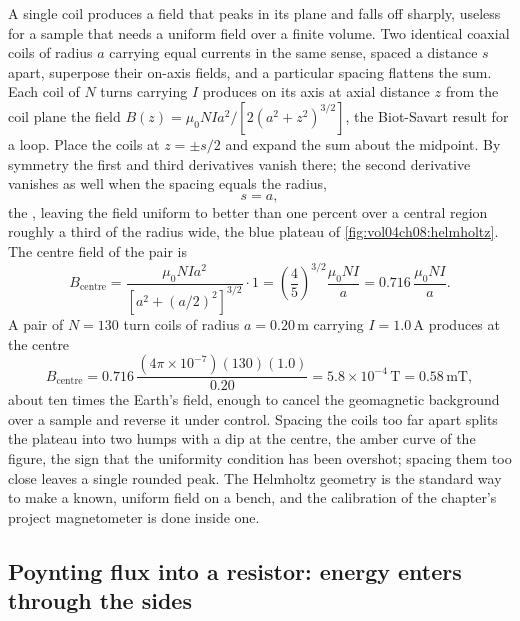 A single coil produces a field that peaks in its plane and falls off sharply,
useless for a sample that needs a uniform field over a finite volume. Two
identical coaxial coils of radius $a$ carrying equal currents in the same
sense, spaced a distance $s$ apart, superpose their on-axis fields, and a
particular spacing flattens the sum. Each coil of $N$ turns carrying $I$
produces on its axis at axial distance $z$ from the coil plane the field
$B(z) = \mu_0 N I a^{2}/[2(a^{2}+z^{2})^{3/2}]$, the Biot-Savart result for a
loop. Place the coils at $z = \pm s/2$ and expand the sum about the midpoint.
By symmetry the first and third derivatives vanish there; the second
derivative vanishes as well when the spacing equals the radius,
\[
s = a,
\]
the , leaving the field uniform to better than
one percent over a central region roughly a third of the radius wide, the
blue plateau of \cref{fig:vol04ch08:helmholtz}. The centre field of the pair
is
\[
B_{\text{centre}} = \frac{\mu_0 N I a^{2}}{[a^{2}+(a/2)^{2}]^{3/2}}\cdot 1
= \left(\frac{4}{5}\right)^{3/2}\frac{\mu_0 N I}{a} = 0.716\,\frac{\mu_0 N I}{
a}.
\]
A pair of $N = 130$ turn coils of radius $a = 0.20\,\si{\meter}$ carrying
$I = 1.0\,\si{\ampere}$ produces at the centre
\[
B_{\text{centre}} = 0.716\,\frac{(4\pi\times 10^{-7})(130)(1.0)}{0.20} =
5.8\times 10^{-4}\,\si{\tesla} = 0.58\,\si{\milli\tesla},
\]
about ten times the Earth's field, enough to cancel the geomagnetic
background over a sample and reverse it under control. Spacing the coils too
far apart splits the plateau into two humps with a dip at the centre, the
amber curve of the figure, the sign that the uniformity condition has been
overshot; spacing them too close leaves a single rounded peak. The Helmholtz
geometry is the standard way to make a known, uniform field on a bench, and
the calibration of the chapter's project magnetometer is done inside one.



\subsection{Poynting flux into a resistor: energy enters through the sides}

